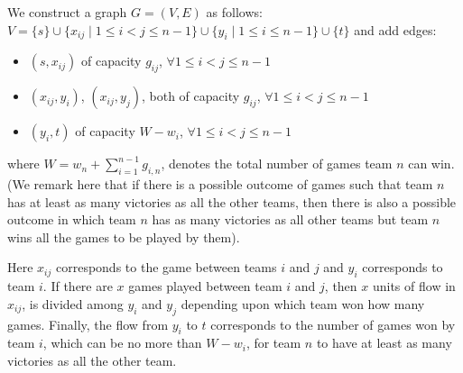 \documentclass[12pt]{article}
\newcommand*{\union}{\cup}
\begin{document}
We construct a graph $G = (V,E)$ as follows:
$V = \{s\} \union \{x_{ij} \mid 1 \leq i < j \leq n-1\} \union \{y_i \mid 1 \leq i \leq n-1\} \union \{t\}$ and add edges:
\begin{itemize}
    \item $(s, x_{ij})$ of capacity $g_{ij}$, $\forall 1 \leq i < j \leq n-1$
    \item $(x_{ij}, y_i)$, $(x_{ij}, y_j)$, both of capacity $g_{ij}$, $\forall 1 \leq i < j \leq n-1$
    \item $(y_i, t)$ of capacity $W - w_i$, $\forall 1 \leq i < j \leq n-1$
\end{itemize}
where $W = w_n + \sum_{i=1}^{n-1} g_{i,n}$, denotes the total number of games team $n$ can win. (We remark here that if there is a possible outcome of games such that team $n$ has at least as many victories as all the other teams, then there is also a possible outcome in which team $n$ has as many victories as all other teams but team $n$ wins all the games to be played by them).

\begin{center}
\end{center}

Here $x_{ij}$ corresponds to the game between teams $i$ and $j$ and $y_i$ corresponds to team $i$. If there are $x$ games played between team $i$ and $j$, then $x$ units of flow in $x_{ij}$, is divided among $y_i$ and $y_j$ depending upon which team won how many games. Finally, the flow from $y_i$ to $t$ corresponds to the number of games won by team $i$, which can be no more than $W - w_i$, for team $n$ to have at least as many victories as all the other team.
\end{document}
